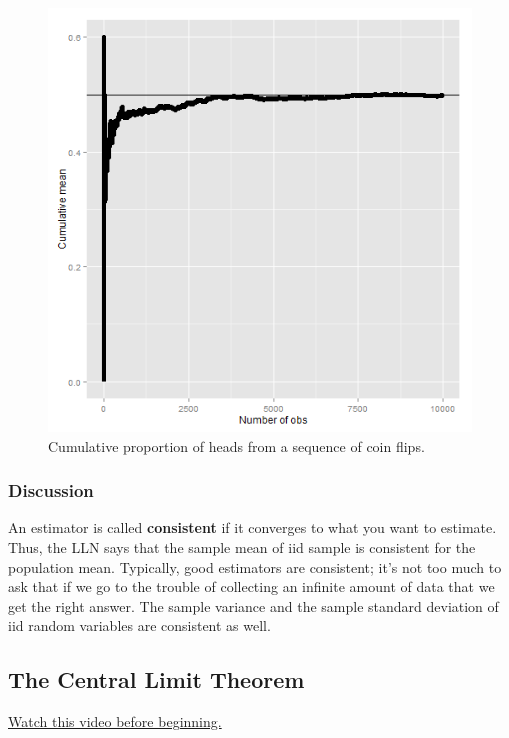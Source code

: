 \documentclass[]{article}
\begin{document}
\begin{figure}[htbp]
\centering
\includegraphics{LeanPub/images/coinLLN-1.png}
\caption{Cumulative proportion of heads from a sequence of coin flips.}
\end{figure}

\subsubsection{Discussion}\label{discussion}

An estimator is called \textbf{consistent} if it converges to what you
want to estimate. Thus, the LLN says that the sample mean of iid sample
is consistent for the population mean. Typically, good estimators are
consistent; it's not too much to ask that if we go to the trouble of
collecting an infinite amount of data that we get the right answer. The
sample variance and the sample standard deviation of iid random
variables are consistent as well.

\subsection{The Central Limit Theorem}\label{the-central-limit-theorem}

\href{http://youtu.be/FAIyVHmniK0?list=PLpl-gQkQivXiBmGyzLrUjzsblmQsLtkzJ}{Watch
this video before beginning.}
\end{document}

